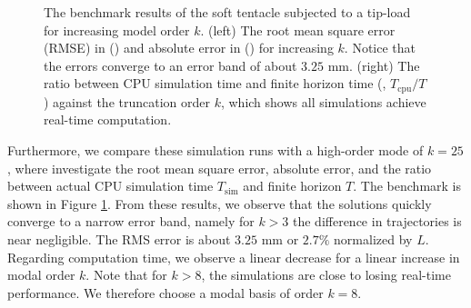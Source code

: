 \begin{example}
\begin{figure}[!t]
  \caption{The benchmark results of the soft tentacle subjected to a tip-load for increasing model order $k$. (left) The root mean square error (RMSE) in () and absolute error in () for increasing $k$. Notice that the errors converge to an error band of about $3.25$ \si{\milli \meter}. (right) The ratio between CPU simulation time and finite horizon time (\ie, $T_{\textrm{cpu}}/T$) against the truncation order $k$, which shows all simulations achieve real-time computation. }
  \label{fig:C3:EX2:mode_convergence_bench}
  \end{figure}
 
 Furthermore, we compare these simulation runs with a high-order mode of $k = 25$, where investigate the root mean square error, absolute error, and the ratio between actual CPU simulation time $T_{\textrm{sim}}$ and finite horizon $T$. The benchmark is shown in Figure \ref{fig:C3:EX2:mode_convergence_bench}. From these results, we observe that the solutions quickly converge to a narrow error band, namely for $k>3$ the difference in trajectories is near negligible. The RMS error is about $3.25$ \si{\milli \meter} or $2.7\%$ normalized by $L$.  Regarding computation time, we observe a linear decrease for a linear increase in modal order $k$. Note that for $k > 8$, the simulations are close to losing real-time performance. We therefore choose a modal basis of order $k = 8$. 
\end{example}


